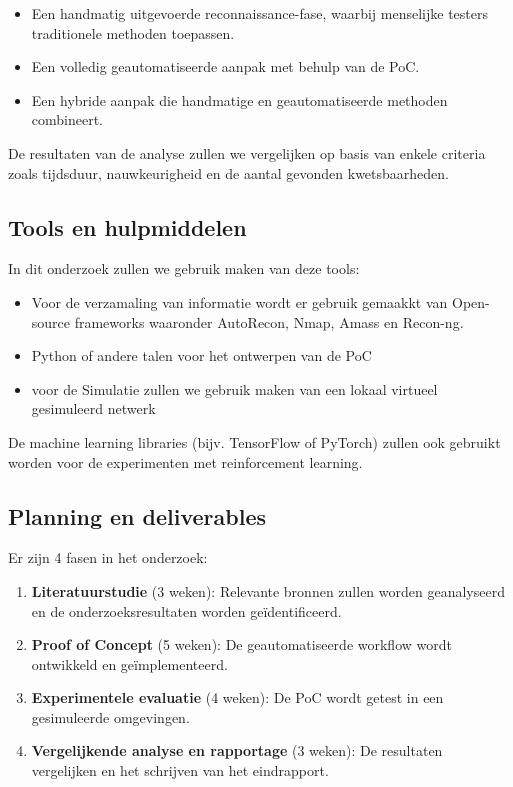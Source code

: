 \begin{itemize}
    \item Een handmatig uitgevoerde reconnaissance-fase, waarbij menselijke testers traditionele methoden toepassen.
    \item Een volledig geautomatiseerde aanpak met behulp van de PoC.
    \item Een hybride aanpak die handmatige en geautomatiseerde methoden combineert.
\end{itemize}

De resultaten van de analyse zullen we vergelijken op basis van enkele criteria zoals tijdsduur, nauwkeurigheid en de aantal gevonden kwetsbaarheden.

\subsection{Tools en hulpmiddelen}

In dit onderzoek zullen we gebruik maken van deze tools: 

\begin{itemize}
    \item Voor de verzamaling van informatie wordt er gebruik gemaakkt van Open-source frameworks waaronder AutoRecon, Nmap, Amass en Recon-ng.
    \item Python of andere talen voor het ontwerpen van de PoC
    \item voor de Simulatie zullen we gebruik maken van een lokaal virtueel gesimuleerd netwerk
\end{itemize}

De machine learning libraries (bijv. TensorFlow of PyTorch) zullen ook gebruikt worden voor de experimenten met reinforcement learning.

\subsection{Planning en deliverables}
Er zijn 4 fasen in het onderzoek:
\begin{enumerate}
    \item \textbf{Literatuurstudie} (3 weken): Relevante bronnen zullen worden geanalyseerd en de onderzoeksresultaten worden geïdentificeerd.
    \item \textbf{Proof of Concept} (5 weken): De geautomatiseerde workflow wordt ontwikkeld en geïmplementeerd.
    \item \textbf{Experimentele evaluatie} (4 weken): De PoC wordt getest in een gesimuleerde omgevingen.
    \item \textbf{Vergelijkende analyse en rapportage} \newline (3 weken): De resultaten vergelijken en het schrijven van het eindrapport.
\end{enumerate}

